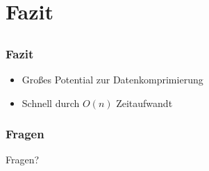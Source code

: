 \documentclass[compress]{beamer}
\begin{document}
\section{Fazit}
\subsection*{}

\begin{frame}
	\frametitle{Fazit}

	\begin{itemize}[<+->]
		\item Großes Potential zur Datenkomprimierung
		\item Schnell durch $O(n)$ Zeitaufwandt
	\end{itemize}
\end{frame}

\begin{frame}
	\frametitle{Fragen}

	\begin{center}
		\Huge{Fragen?}
	\end{center}
\end{frame}
\end{document}
